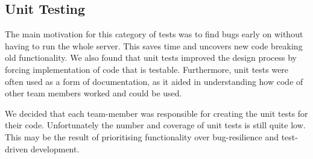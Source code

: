 \subsection{Unit Testing}
The main motivation for this category of tests was to find bugs early on without having to run the whole server. This saves time and uncovers new code breaking old functionality. We also found that unit tests improved the design process by forcing implementation of code that is testable. Furthermore, unit tests were often used as a form of documentation, as it aided in understanding how code of other team members worked and could be used. \par 
We decided that each team-member was responsible for creating the unit tests for their code. Unfortunately the number and coverage of unit tests is still quite low. This may be the result of prioritising functionality over bug-resilience and test-driven development. 
